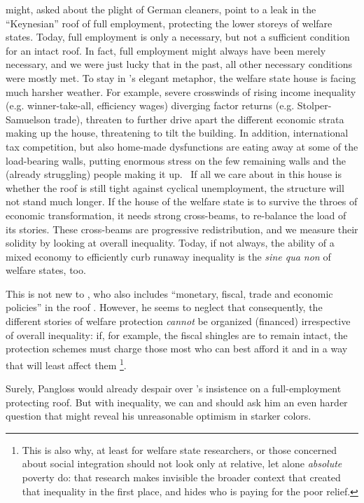 \documentclass[11pt,a4paper,oneside]{article}
\begin{document}
\begin{enumerate}
	\citeauthor{Offe2003} might, asked about the plight of German cleaners, point to a leak in the ``Keynesian'' roof of full employment, protecting the lower storeys of welfare states.
	Today, full employment is only a necessary, but not a sufficient condition for an intact roof.
	In fact, full employment might always have been merely necessary, and we were just lucky that in the past, all other necessary conditions were mostly met.
	To stay in \citeauthor{Offe2003}'s elegant metaphor, the welfare state house is facing much harsher weather.
	For example, severe crosswinds of rising income inequality (e.g. winner-take-all, efficiency wages) diverging factor returns (e.g. Stolper-Samuelson trade), threaten to further drive apart the different economic strata making up the house, threatening to tilt the building.
	In addition, international tax competition, but also home-made dysfunctions are eating away at some of the load-bearing walls, putting enormous stress on the few remaining walls and the (already struggling) people making it up.~
	If all we care about in this house is whether the roof is still tight against cyclical unemployment, the structure will not stand much longer.
	If the house of the welfare state is to survive the throes of economic transformation, it needs strong cross-beams, to re-balance the load of its stories.
	These cross-beams are progressive redistribution, and we measure their solidity by looking at overall inequality.
	Today, if not always, the ability of a mixed economy to efficiently curb runaway inequality is the \emph{sine qua non} of welfare states, too.

	This is not new to \cite{Offe2003}, who also includes ``monetary, fiscal, trade and economic policies'' in the roof \citeyearpar[543]{Offe2003}.
	However, he seems to neglect that consequently, the different stories of welfare protection \emph{cannot} be organized (financed) irrespective of overall inequality:
	if, for example, the fiscal shingles are to remain intact, the protection schemes must charge those most who can best afford it and in a way that will least affect them
	\footnote{
		This is also why, at least for welfare state researchers, or those concerned about social integration should not look only at relative, let alone \emph{absolute} poverty \citep[as][1, and many others]{Grow2005} do:
		that research makes invisible the broader context that created that inequality in the first place, and hides who is paying for the poor relief.
	}.

	Surely, Pangloss would already despair over \cite{Offe2003}'s insistence on a full-employment protecting roof.
	But with inequality, we can and should ask him an even harder question that might reveal his unreasonable optimism in starker colors.


\end{enumerate}
\end{document}
